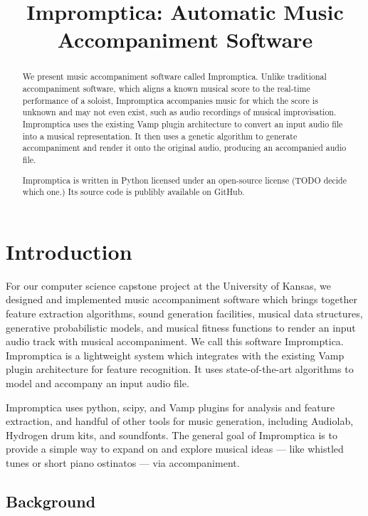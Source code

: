 \documentclass[11pt,conference,letterpaper]{IEEEtran}
\begin{document}
\title{Impromptica: Automatic Music Accompaniment Software}
\author{}

\maketitle

\begin{abstract}
We present music accompaniment software called Impromptica. Unlike traditional accompaniment software, which aligns a known musical score to the real-time performance of a soloist, Impromptica accompanies music for which the score is unknown and may not even exist, such as audio recordings of musical improvisation. Impromptica uses the existing Vamp plugin architecture to convert an input audio file into a musical representation. It then uses a genetic algorithm to generate accompaniment and render it onto the original audio, producing an accompanied audio file.

Impromptica is written in Python licensed under an open-source license (TODO decide which one.) Its source code is publibly available on GitHub.
\end{abstract}

\section{Introduction}

For our computer science capstone project at the University of Kansas, we designed and implemented music accompaniment software which brings together feature extraction algorithms, sound generation facilities, musical data structures, generative probabilistic models, and musical fitness functions to render an input audio track with musical accompaniment. We call this software Impromptica. Impromptica is a lightweight system which integrates with the existing Vamp plugin architecture for feature recognition. It uses state-of-the-art algorithms to model and accompany an input audio file.

Impromptica uses python, scipy, and Vamp plugins for analysis and feature extraction, and handful of other tools for music generation, including Audiolab, Hydrogen drum kits, and soundfonts. The general goal of Impromptica is to provide a simple way to expand on and explore musical ideas --- like whistled tunes or short piano ostinatos --- via accompaniment.

\subsection{Background}
\end{document}
